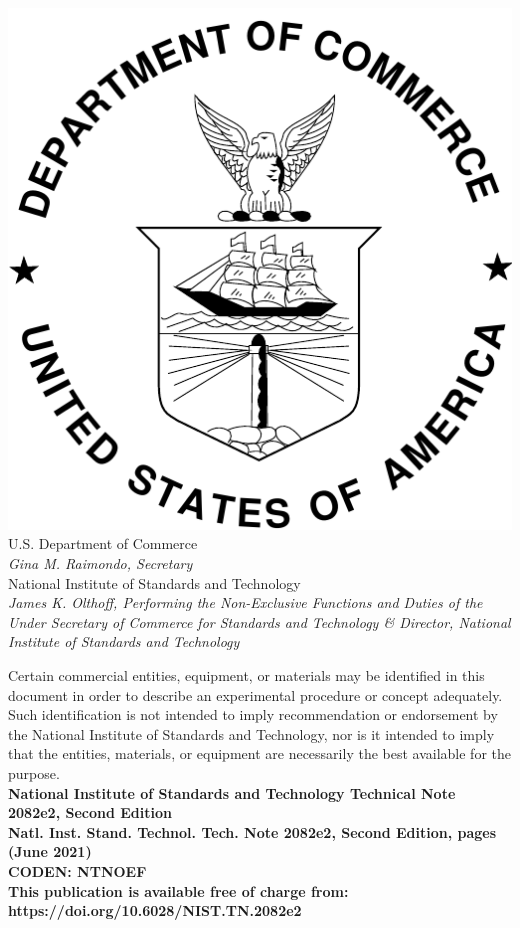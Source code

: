 \documentclass[12pt]{article}
\newcommand{\pubnumber}{2082e2, Second Edition}
\newcommand{\DOI}{https://doi.org/10.6028/NIST.TN.2082e2}
\newcommand{\monthyear}{June 2021}
\begin{document}
\begin{titlepage}
\begin{flushright}
\includegraphics[width=0.18\linewidth]{DoC-logo}\\
\vfill
\footnotesize U.S. Department of Commerce\\
\textit{Gina M. Raimondo, Secretary}\\
\vspace{10pt}
National Institute of Standards and Technology\\
\textit{James K. Olthoff, Performing the Non-Exclusive Functions and Duties of the Under Secretary of Commerce for Standards and Technology \& Director, National Institute of Standards and Technology}
\end{flushright}
\end{titlepage}

\begin{titlepage}
\begin{flushright}
\footnotesize  Certain commercial entities, equipment, or materials may be identified in this document in order to describe an experimental procedure or concept adequately. Such identification is not intended to imply recommendation or endorsement by the National Institute of Standards and Technology, nor is it intended to imply that the entities, materials, or equipment are necessarily the best available for the purpose.\\
\vfill
\normalsize \textbf{National Institute of Standards and Technology Technical Note \pubnumber\\
Natl. Inst. Stand. Technol. Tech. Note \pubnumber, \pageref{LastPage} pages (\monthyear)} \\
\textbf{CODEN: NTNOEF}\\
\vspace{12pt}
\textbf{This publication is available free of charge from: \DOI}
\vfill
\end{flushright}
\end{titlepage}
\end{document}
